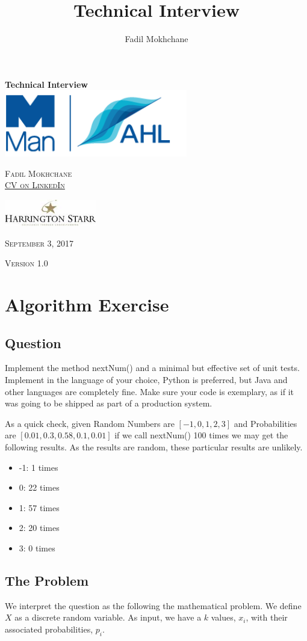 \documentclass[12pt,a4paper,article]{memoir} %
\title{Technical Interview}
\author{Fadil Mokhchane}
\newlength\drop
\newcommand*\titleM{\begingroup%
\setlength\drop{0.08\textheight}
\centering
\vspace*{\drop}
{\Huge\bfseries Technical Interview}\\[\baselineskip]
\vfill
\includegraphics[width=0.6\textwidth]{img/logo.png}\par\vspace{1cm}
\vfill
{\Huge\scshape Fadil Mokhchane \\ 
\small \href{https://www.linkedin.com/in/fadil/}{CV on LinkedIn} }\par
\vspace{1cm}
\includegraphics[width=0.3\textwidth]{img/harrington.jpg}\par
\vfill
\vspace*{2\drop}
{\scshape September 3, 2017}\par
{\scshape \small Version 1.0}\par
\endgroup}
\begin{document}
\begin{titlingpage}
\titleM
\end{titlingpage}

\newpage
\tableofcontents* %
{}
\listoffigures
\listoftables
\vfill
\newpage

\chapter{Algorithm Exercise}
\section{Question}
Implement the method nextNum() and a minimal but effective set of unit tests. 
Implement in the language of your choice, Python is preferred, but Java and 
other languages are completely fine. 
Make sure your code is exemplary, as if it was going to be shipped as part of a production system.

As a quick check, given Random Numbers are $[-1, 0, 1, 2, 3]$ and 
Probabilities are $[0.01, 0.3, 0.58, 0.1, 0.01]$ if we call nextNum() 100 times 
we may get the following results. As the results are random, these particular results are unlikely.
\begin{itemize}
	\item -1: 1 times 
	\item 0: 22 times
	\item 1: 57 times 
	\item 2: 20 times
	\item 3: 0 times 
\end{itemize}

\section{The Problem}
\label{sec:problem}
We interpret the question as the following the mathematical problem. 
We define $X$ as a discrete random variable. 
As input, we have a $k$ values, $x_i$, with their associated probabilities, $p_i$.
\end{document}
